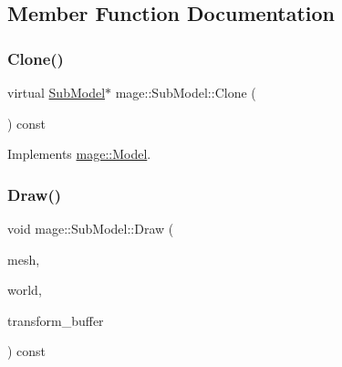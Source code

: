 \subsection{Member Function Documentation}
\hypertarget{classmage_1_1_sub_model_a368bcc2ee819cc29ec0203e314ae91d3}{}\label{classmage_1_1_sub_model_a368bcc2ee819cc29ec0203e314ae91d3} 
\subsubsection{\texorpdfstring{Clone()}{Clone()}}
{\footnotesize\ttfamily virtual \hyperlink{classmage_1_1_sub_model}{Sub\+Model}$\ast$ mage\+::\+Sub\+Model\+::\+Clone (\begin{DoxyParamCaption}{ }\end{DoxyParamCaption}) const\hspace{0.3cm}{\ttfamily [virtual]}}



Implements \hyperlink{classmage_1_1_model_ae5e9bee52da0db8c7a29920c13ed40ea}{mage\+::\+Model}.

\hypertarget{classmage_1_1_sub_model_a16400e2d0cc14a38fba18971e227d2ee}{}\label{classmage_1_1_sub_model_a16400e2d0cc14a38fba18971e227d2ee} 
\subsubsection{\texorpdfstring{Draw()}{Draw()}}
{\footnotesize\ttfamily void mage\+::\+Sub\+Model\+::\+Draw (\begin{DoxyParamCaption}\item[{const \hyperlink{classmage_1_1_mesh}{Mesh} \&}]{mesh,  }\item[{const \hyperlink{classmage_1_1_world}{World} \&}]{world,  }\item[{const \hyperlink{structmage_1_1_transform_buffer}{Transform\+Buffer} \&}]{transform\+\_\+buffer }\end{DoxyParamCaption}) const}

\hypertarget{classmage_1_1_sub_model_a8487b28be21ae182cd97c61325b2b478}{}\label{classmage_1_1_sub_model_a8487b28be21ae182cd97c61325b2b478} 
